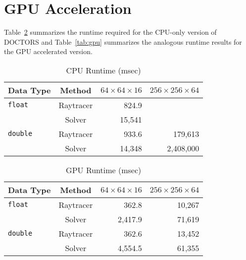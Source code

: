 \section{GPU Acceleration}

Table~\ref{tab:cpu} summarizes the runtime required for the CPU-only version of DOCTORS and Table~\ref{tab:gpu} summarizes the analogous runtime results for the GPU accelerated version. 

\begin{table}[ht]
\caption{CPU Runtime (msec)}
\centering 
\begin{tabular}{l c r r}
\hline \hline   
Data Type & Method & $64 \times 64 \times 16$ & $256 \times 256 \times 64$\\ [0.5ex] 
\hline
\texttt{float}  & Raytracer & 824.9   &  \\
                & Solver    & 15,541  &  \\
\texttt{double} & Raytracer & 933.6   & 179,613 \\
                & Solver    & 14,348   & 2,408,000 \\  [1ex]
\hline
\end{tabular}
\label{tab:cpu}
\end{table}

\begin{table}[ht]
\caption{GPU Runtime (msec)}
\centering 
\begin{tabular}{l c r r}
\hline \hline   
Data Type & Method & $64 \times 64 \times 16$ & $256 \times 256 \times 64$\\ [0.5ex] 
\hline
\texttt{float}  & Raytracer & 362.8   &  10,267 \\
                & Solver    & 2,417.9  &  71,619 \\
\texttt{double} & Raytracer & 362.6   & 13,452 \\
                & Solver    & 4,554.5   & 61,355 \\  [1ex]
\hline
\end{tabular}
\label{tab:cpu}
\end{table}

\endinput
